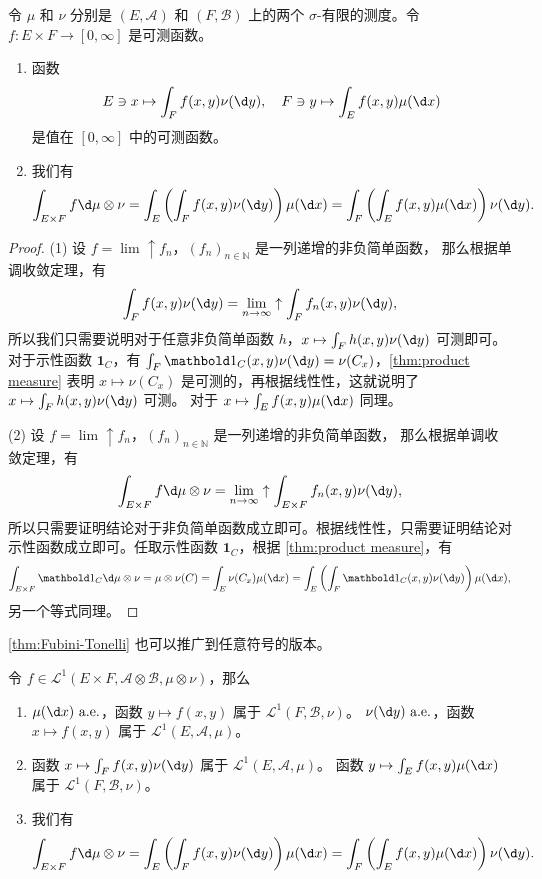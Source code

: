 \documentclass[fontset=none]{Notes}
\newcommand{\ulim}[1][]{\lim_{#1}\mathrel{\uparrow}}
\newcommand{\indicator}[1]{\mathbold 1_{#1}}
\newcommand{\alev}[1]{\text{$#1$ a.e.}}
\begin{document}
\begin{theorem}\label{thm:Fubini-Tonelli}
  令 $\mu$ 和 $\nu$ 分别是 $(E,\mathcal{A})$ 和 $(F,\mathcal{B})$ 上的两个
  $\sigma$-有限的测度。令 $f:E\times F\to [0,\infty]$ 是可测函数。
  \begin{enumerate}
    \item 函数
    \[
      E\ni x\mapsto \int_F f(x,y)\nu(\d y),\quad 
      F\ni y\mapsto \int_E f(x,y)\mu(\d x)  
    \]
    是值在 $[0,\infty]$ 中的可测函数。
    \item 我们有
    \[
      \int_{E\times F}f\d\mu\otimes\nu 
      =\int_E\left(\int_F f(x,y)\nu(\d y)\right)\mu(\d x)=\int_F
      \left(\int_E f(x,y)\mu(\d x)\right)\nu(\d y).
    \]
  \end{enumerate}
\end{theorem}
\begin{proof}
  (1) 设 $f=\ulim f_n$，$(f_n)_{n\in \mathbb{N}}$ 是一列递增的非负简单函数，
  那么根据单调收敛定理，有
  \[
    \int_F f(x,y)\nu(\d y)=\ulim[n\to\infty]\int_Ff_n(x,y)\nu(\d y)  ,
  \]
  所以我们只需要说明对于任意非负简单函数 $h$，$x\mapsto \int_F h(x,y)\nu(\d y)$
  可测即可。对于示性函数 $\indicator{C}$，有
  $\int_F \indicator{C}(x,y) \nu(\d y)=\nu(C_x)$，\autoref{thm:product measure}
  表明 $x\mapsto \nu(C_x)$ 是可测的，再根据线性性，这就说明了
  $x\mapsto \int_F h(x,y)\nu(\d y)$ 可测。
  对于 $x\mapsto\int_E f(x,y)\mu(\d x)$ 同理。

  (2) 设 $f=\ulim f_n$，$(f_n)_{n\in \mathbb{N}}$ 是一列递增的非负简单函数，
  那么根据单调收敛定理，有
  \[
    \int_{E\times F} f\d\mu\otimes \nu
    =\ulim[n\to\infty]\int_{E\times F}f_n(x,y)\nu(\d y),  
  \]
  所以只需要证明结论对于非负简单函数成立即可。根据线性性，只需要证明结论对
  示性函数成立即可。任取示性函数 $\indicator{C}$，根据 \autoref{thm:product measure}，有
  \[
    \int_{E\times F} \indicator{C}\d\mu\otimes\nu=
    \mu\otimes \nu(C)=\int_E\nu(C_x)\mu(\d x)  
    =\int_E\left(\int_F \indicator{C}(x,y)\nu(\d y)\right)\mu(\d x),
  \]
  另一个等式同理。
\end{proof}

\autoref{thm:Fubini-Tonelli} 也可以推广到任意符号的版本。

\begin{theorem}
  令 $f\in \mathcal{L}^1(E\times F,\mathcal{A}\otimes \mathcal{B},\mu\otimes\nu)$，那么
  \begin{enumerate}
    \item $\alev{\mu(\d x)}$，函数 $y\mapsto f(x,y)$ 属于 $\mathcal{L}^1(F,\mathcal{B},\nu)$。
    $\alev{\nu(\d y)}$，函数 $x\mapsto f(x,y)$ 属于 $\mathcal{L}^1(E,\mathcal{A},\mu)$。
    \item 函数 $x\mapsto \int_F f(x,y)\nu(\d y)$ 属于 $\mathcal{L}^1(E,\mathcal{A},\mu)$。
    函数 $y\mapsto \int_E f(x,y)\mu(\d x)$ 属于 $\mathcal{L}^1(F,\mathcal{B},\nu)$。
    \item 我们有
    \[
      \int_{E\times F}f\d\mu\otimes\nu 
      =\int_E\left(\int_F f(x,y)\nu(\d y)\right)\mu(\d x)=\int_F
      \left(\int_E f(x,y)\mu(\d x)\right)\nu(\d y).
    \]
  \end{enumerate}
\end{theorem}
\end{document}

